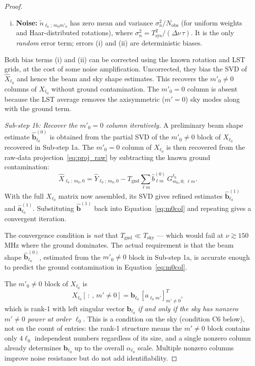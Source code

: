 \documentclass{aastex631}
\newcommand{\Tgnd}{T_\mathrm{gnd}}
\theoremstyle{plain}
\theoremstyle{remark}
\begin{document}
\begin{proof}
\begin{enumerate}[(i)]
  \item \textbf{Noise:}
    $\tilde{n}_{\ell_0;\,m_0 m'_0}$ has zero mean and variance
    $\sigma_n^2 / N_\mathrm{obs}$ (for uniform weights and
    Haar-distributed rotations), where
    $\sigma_n^2 = T_\mathrm{sys}^2/(\Delta\nu\,\tau)$.
    It is the only \emph{random} error term; errors (i) and (ii)
    are deterministic biases.
\end{enumerate}
Both bias terms (i) and (ii) can be corrected using the known
rotation and LST grids, at the cost of some noise amplification.
Uncorrected, they bias the SVD of $\hat{X}_{\ell_0}$ and hence
the beam and sky shape estimates.
This recovers the $m'_0 \neq 0$ columns of $X_{\ell_0}$
without ground contamination.
The $m'_0 = 0$ column is absent because the LST average removes
the axisymmetric ($m'=0$) sky modes along with the ground term.

\textit{Sub-step 1b: Recover the $m'_0 = 0$ column iteratively.}
A preliminary beam shape estimate $\hat{\mathbf{b}}^{(0)}_{\ell_0}$
is obtained from the partial SVD of the $m'_0 \neq 0$ block of
$X_{\ell_0}$ recovered in Sub-step 1a.
The $m'_0 = 0$ column of $X_{\ell_0}$ is then recovered from the
raw-data projection~\ref{eq:proj_raw} by subtracting the known
ground contamination:
\begin{equation} \label{eq:m0col}
  \hat{X}_{\ell_0;\,m_0, 0}
  = \hat{Y}_{\ell_0;\,m_0, 0}
  - \Tgnd \sum_{\ell m} \hat{b}^{(0)}_{\ell m}\,
    G^{\ell_0}_{m_0, 0;\,\ell m}.
\end{equation}
With the full $X_{\ell_0}$ matrix now assembled, its SVD gives
refined estimates $\hat{\mathbf{b}}^{(1)}_{\ell_0}$ and
$\hat{\mathbf{a}}^{(1)}_{\ell_0}$.
Substituting $\hat{\mathbf{b}}^{(1)}$ back into
Equation~\ref{eq:m0col} and repeating gives a convergent iteration.

The convergence condition is \emph{not} that $\Tgnd \ll T_\mathrm{sky}$
--- which would fail at $\nu \gtrsim 150$\,MHz where the ground
dominates.
The actual requirement is that the beam shape
$\hat{\mathbf{b}}^{(0)}_{\ell_0}$, estimated from the $m'_0 \neq 0$
block in Sub-step 1a, is accurate enough to predict the ground
contamination in Equation~\ref{eq:m0col}.

The $m'_0 \neq 0$ block of $X_{\ell_0}$ is
\begin{equation}
  X_{\ell_0}[\,:\,,\, m' \neq 0]
  = \mathbf{b}_{\ell_0}\, [a_{\ell_0 m'}]_{m'\neq 0}^T,
\end{equation}
which is rank-1 with left singular vector $\mathbf{b}_{\ell_0}$
\emph{if and only if the sky has nonzero $m' \neq 0$ power at order
$\ell_0$}.
This is a condition on the sky (condition C6 below), not on the
count of entries: the rank-1 structure means the $m' \neq 0$ block
contains only $4\ell_0$ independent numbers regardless of its size,
and a single nonzero column already determines $\mathbf{b}_{\ell_0}$
up to the overall $\alpha_{\ell_0}$ scale.
Multiple nonzero columns improve noise resistance but do not add
identifiability.


\end{proof}
\end{document}
